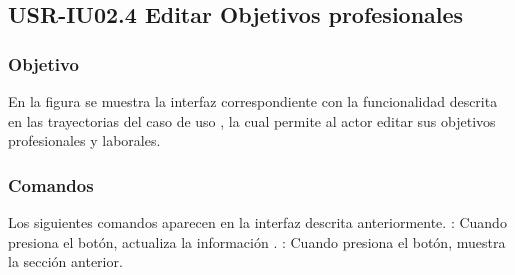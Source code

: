 \clearpage
\subsection{USR-IU02.4 Editar Objetivos profesionales}

\subsubsection{Objetivo}
En la figura  se muestra la interfaz correspondiente con la funcionalidad descrita en las
trayectorias del caso de uso  , la cual permite al actor editar sus objetivos profesionales y laborales.

\subsubsection{Comandos}
Los siguientes comandos aparecen en la interfaz descrita anteriormente.
\Titem {} : Cuando presiona el botón, actualiza la información .
\Titem {} : Cuando presiona el botón, muestra la sección anterior.%



\clearpage
